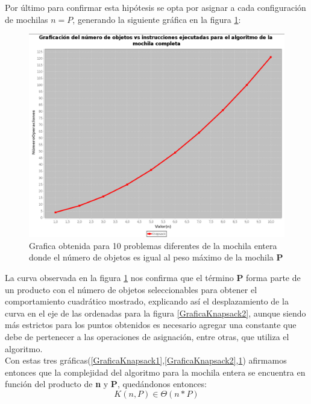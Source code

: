         Por último para confirmar esta hipótesis se opta por asignar a cada configuración de mochilas $n=P$, generando la siguiente gráfica en la figura \ref{GraficaKnapsack3}:\\
        \begin{figure}[h!]
            \centering
            \includegraphics[width=15cm]{Knapsack/GraficaKnapsack3.png}
            \caption{Grafica obtenida para 10 problemas diferentes de la mochila entera donde el número de objetos es igual al peso máximo de la mochila \textbf{P}}
            \label{GraficaKnapsack3}
        \end{figure}
        La curva observada en la figura \ref{GraficaKnapsack3} nos confirma que el término \textbf{P} forma parte de un producto con el número de objetos seleccionables para obtener el comportamiento cuadrático mostrado, explicando así el desplazamiento de la curva en el eje de las ordenadas para la figura \ref{GraficaKnapsack2}, aunque siendo más estrictos para los puntos obtenidos es necesario agregar una constante que debe de pertenecer a las operaciones de asignación, entre otras, que utiliza el algoritmo.\\
        
        Con estas tres gráficas(\ref{GraficaKnapsack1},\ref{GraficaKnapsack2},\ref{GraficaKnapsack3}) afirmamos entonces que la complejidad del algoritmo para la mochila entera se encuentra en función del producto de \textbf{n} y \textbf{P}, quedándonos entonces:
        \begin{equation*}
            K(n,P) \in \Theta(n*P)
        \end{equation*}

